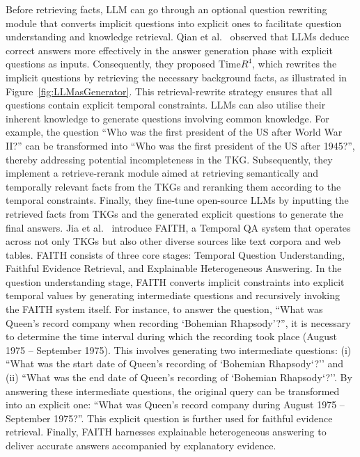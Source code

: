 Before retrieving facts, LLM can go through an optional question rewriting module that converts implicit questions into explicit ones to facilitate question understanding and knowledge retrieval. 
Qian et al.~\cite{qianTimeR4TimeawareRetrievalAugmented2024} observed that LLMs deduce correct answers more effectively in the answer generation phase with explicit questions as inputs.
Consequently, they proposed Time$R^4$, which rewrites the implicit questions by retrieving the necessary background facts, as illustrated in Figure~\ref{fig:LLMasGenerator}. 
This retrieval-rewrite strategy ensures that all questions contain explicit temporal constraints. 
LLMs can also utilise their inherent knowledge to generate questions involving common knowledge. For example, the question ``Who was the first president of the US after World War II?'' can be transformed into ``Who was the first president of the US after 1945?'', thereby addressing potential incompleteness in the TKG. 
Subsequently, they implement a retrieve-rerank module aimed at retrieving semantically and temporally relevant facts from the TKGs
and reranking them according to the temporal constraints. Finally, they fine-tune open-source LLMs by inputting the retrieved facts from TKGs and the generated explicit questions to generate the final answers.
Jia et al.~\cite{jia2024faithful} introduce FAITH, a Temporal QA system that operates across not only TKGs but also other diverse sources like text corpora and web tables. FAITH consists of three core stages: Temporal Question Understanding, Faithful Evidence Retrieval, and Explainable Heterogeneous Answering. In the question understanding stage, FAITH converts implicit constraints into explicit temporal values by generating intermediate questions and recursively invoking the FAITH system itself. For instance, to answer the question, “What was Queen’s record company when recording ‘Bohemian Rhapsody’?”, it is necessary to determine the time interval during which the recording took place (August 1975 – September 1975). This involves generating two intermediate questions: (i) ``What was the start date of Queen’s recording of `Bohemian Rhapsody`?'' and (ii) ``What was the end date of Queen’s recording of `Bohemian Rhapsody`?''. By answering these intermediate questions, the original query can be transformed into an explicit one: ``What was Queen’s record company during August 1975 – September 1975?''. This explicit question is further used for faithful evidence retrieval. Finally, FAITH harnesses explainable heterogeneous answering to deliver accurate answers accompanied by explanatory evidence.

